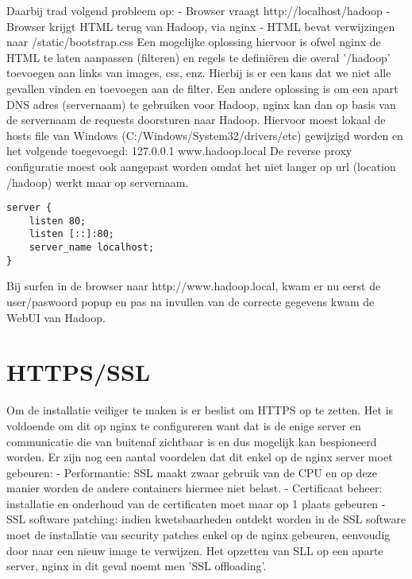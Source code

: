 Daarbij trad volgend probleem op:
\newline
\newline
- Browser vraagt http://localhost/hadoop
- Browser krijgt HTML terug van Hadoop, via nginx
- HTML bevat verwijzingen naar /static/bootstrap.css
\newline
\newline
Een mogelijke oplossing hiervoor is ofwel nginx de HTML te laten aanpassen (filteren) en regels te definiëren die overal '/hadoop' toevoegen aan links van images, css, enz. Hierbij is er een kans dat we niet alle gevallen vinden en toevoegen aan de filter.
Een andere oplossing is om een apart DNS adres (servernaam) te gebruiken voor Hadoop, nginx kan dan op basis van de servernaam de requests doorsturen naar Hadoop. Hiervoor moest lokaal de hosts file van Windows 
\newline
(C:/Windows/System32/drivers/etc) gewijzigd worden en het volgende toegevoegd:
127.0.0.1 www.hadoop.local
\newline
\newline
De reverse proxy configuratie moest ook aangepast worden omdat het niet langer op url (location /hadoop) werkt maar op servernaam.
\newline
\newline
\begin{lstlisting}
server {
    listen 80;
    listen [::]:80;
    server_name localhost;
}

\end{lstlisting}

Bij surfen in de browser naar http://www.hadoop.local, kwam er nu eerst de user/paswoord popup en pas na invullen van de correcte gegevens kwam de WebUI van Hadoop.

\section{HTTPS/SSL}

Om de installatie veiliger te maken is er beslist om HTTPS op te zetten. Het is voldoende om dit op nginx te configureren want dat is de enige server en communicatie die van buitenaf zichtbaar is en dus mogelijk kan bespioneerd worden. Er zijn nog een aantal voordelen dat dit enkel op de nginx server moet gebeuren:
\newline
\newline
- Performantie: SSL maakt zwaar gebruik van de CPU en op deze manier worden de andere containers hiermee niet belast.
- Certificaat beheer: installatie en onderhoud van de certificaten moet maar op 1 plaats gebeuren
- SSL software patching: indien kwetsbaarheden ontdekt worden in de SSL software moet de installatie van security patches enkel op de nginx gebeuren, eenvoudig door naar een nieuw image te verwijzen.
\newline
\newline
Het opzetten van SLL op een aparte server, nginx in dit geval noemt men 'SSL offloading'.

